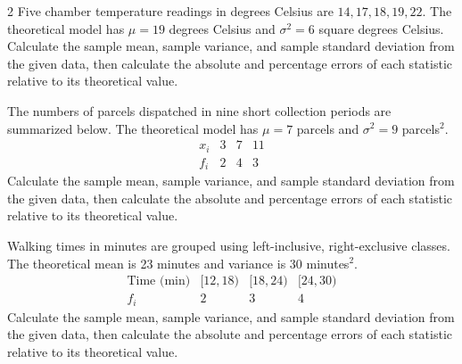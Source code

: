\begin{multicols}{2}
\label{sec:c7-2}
Five chamber temperature readings in degrees Celsius are $14,17,18,19,22$.
The theoretical model has $\mu=19$ degrees Celsius and $\sigma^2=6$ square degrees Celsius.
Calculate the sample mean, sample variance, and sample standard deviation from the given data, then calculate the absolute and percentage errors of each statistic relative to its theoretical value. 



\columnbreak

\label{sec:c7-3}
The numbers of parcels dispatched in nine short collection periods are summarized below.
The theoretical model has $\mu=7$ parcels and $\sigma^2=9$ parcels$^2$.
\[
\begin{array}{c|rrr}x_i&3&7&11\\\hline f_i&2&4&3\end{array}
\]
Calculate the sample mean, sample variance, and sample standard deviation from the given data, then calculate the absolute and percentage errors of each statistic relative to its theoretical value. 


\label{sec:c7-4}
Walking times in minutes are grouped using left-inclusive, right-exclusive classes.
The theoretical mean is 23 minutes and variance is 30 minutes$^2$.
\[
\begin{array}{c|rrr}
\text{Time (min)}&[12,18)&[18,24)&[24,30)\\\hline
f_i&2&3&4
\end{array}
\]
Calculate the sample mean, sample variance, and sample standard deviation from the given data, then calculate the absolute and percentage errors of each statistic relative to its theoretical value. 


\end{multicols}

